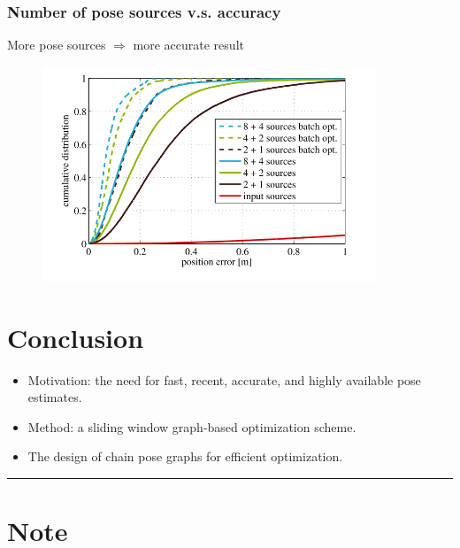 \documentclass[letterpaper,10pt]{article}
\begin{document}
\subsubsection{Number of pose sources v.s. accuracy}
More pose sources $\Rightarrow$ more accurate result
\begin{figure}[!ht]
	\centering
	\includegraphics[width=10cm]{./img/sources.png}
\end{figure}

\section{Conclusion}
\begin{itemize}
	\item Motivation: the need for fast, recent, accurate, and highly available pose estimates.
	\item Method: a sliding window graph-based optimization scheme.
	\item The design of chain pose graphs for efficient optimization.
\end{itemize}

\begin{center}\rule{\textwidth}{1pt}\end{center}
\section{Note}
\end{document}
